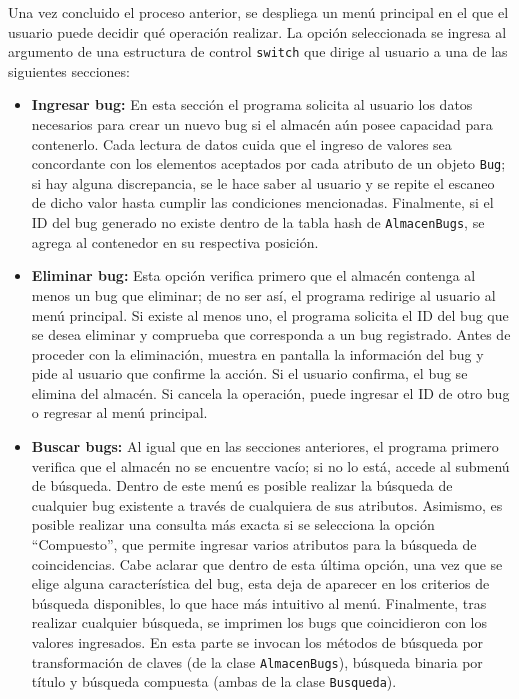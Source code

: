 \documentclass[12pt,letterpaper]{article}
\begin{document}
Una vez concluido el proceso anterior, se despliega un menú principal en el que el usuario puede decidir qué operación realizar. La opción seleccionada se ingresa al argumento de una estructura de control \texttt{switch} que dirige al usuario a una de las siguientes secciones:

\begin{itemize}
    \item \textbf{Ingresar bug:} En esta sección el programa solicita al usuario los datos necesarios para crear un nuevo bug si el almacén aún posee capacidad para contenerlo. Cada lectura de datos cuida que el ingreso de valores sea concordante con los elementos aceptados por cada atributo de un objeto \texttt{Bug}; si hay alguna discrepancia, se le hace saber al usuario y se repite el escaneo de dicho valor hasta cumplir las condiciones mencionadas. Finalmente, si el ID del bug generado no existe dentro de la tabla hash de \texttt{AlmacenBugs}, se agrega al contenedor en su respectiva posición.
    \item \textbf{Eliminar bug:} Esta opción verifica primero que el almacén contenga al menos un bug que eliminar; de no ser así, el programa redirige al usuario al menú principal. Si existe al menos uno, el programa solicita el ID del bug que se desea eliminar y comprueba que corresponda a un bug registrado. Antes de proceder con la eliminación, muestra en pantalla la información del bug y pide al usuario que confirme la acción. Si el usuario confirma, el bug se elimina del almacén. Si cancela la operación, puede ingresar el ID de otro bug o regresar al menú principal.
    \item \textbf{Buscar bugs:} Al igual que en las secciones anteriores, el programa primero verifica que el almacén no se encuentre vacío; si no lo está, accede al submenú de búsqueda. Dentro de este menú es posible realizar la búsqueda de cualquier bug existente a través de cualquiera de sus atributos. Asimismo, es posible realizar una consulta más exacta si se selecciona la opción ``Compuesto'', que permite ingresar varios atributos para la búsqueda de coincidencias. Cabe aclarar que dentro de esta última opción, una vez que se elige alguna característica del bug, esta deja de aparecer en los criterios de búsqueda disponibles, lo que hace más intuitivo al menú. Finalmente, tras realizar cualquier búsqueda, se imprimen los bugs que coincidieron con los valores ingresados. En esta parte se invocan los métodos de búsqueda por transformación de claves (de la clase \texttt{AlmacenBugs}), búsqueda binaria por título y búsqueda compuesta (ambas de la clase \texttt{Busqueda}).

\end{itemize}
\end{document}
